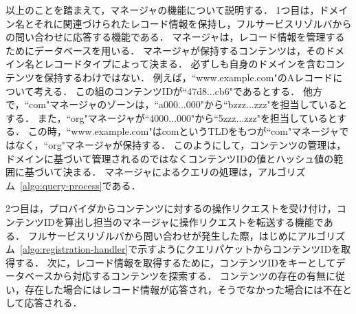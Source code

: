 以上のことを踏まえて，マネージャの機能について説明する．
1つ目は，ドメイン名とそれに関連づけられたレコード情報を保持し，フルサービスリゾルバからの問い合わせに応答する機能である．
マネージャは，レコード情報を管理するためにデータベースを用いる．
マネージャが保持するコンテンツは，そのドメイン名とレコードタイプによって決まる．
必ずしも自身のドメインを含むコンテンツを保持するわけではない．
例えば，``www.example.com"のAレコードについて考える．
この組のコンテンツIDが``47d8...cb6"であるとする．
他方で，``com"マネージャのゾーンは，``a000...000"から``bzzz...zzz"を担当しているとする．
また，``org"マネージャが``4000...000"から``5zzz...zzz"を担当しているとする．
この時，``www.example.com"はcomというTLDをもつが``com"マネージャではなく，``org"マネージャが保持する．
このようにして，コンテンツの管理は，ドメインに基づいて管理されるのではなくコンテンツIDの値とハッシュ値の範囲に基づいて決まる．
マネージャによるクエリの処理は，アルゴリズム~\ref{algo:query-process}である．
\newpage



\newpage
2つ目は，プロバイダからコンテンツに対するの操作リクエストを受け付け，コンテンツIDを算出し担当のマネージャに操作リクエストを転送する機能である．
フルサービスリゾルバから問い合わせが発生した際，はじめにアルゴリズム~\ref{algo:registration-handler}で示すようにクエリパケットからコンテンツIDを取得する．
次に，レコード情報を取得するために，コンテンツIDをキーとしてデータベースから対応するコンテンツを探索する．
コンテンツの存在の有無に従い，存在した場合にはレコード情報が応答され，そうでなかった場合には不在として応答される．


